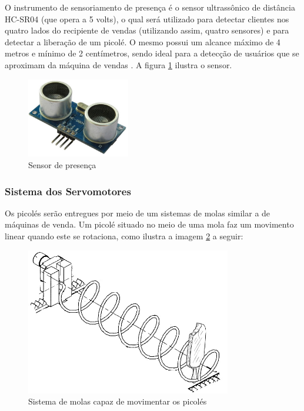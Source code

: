 O instrumento de sensoriamento de presença é o sensor ultrassônico de distância HC-SR04 (que opera a 5 volts), o qual será utilizado para detectar clientes nos quatro lados do recipiente de vendas (utilizando assim, quatro sensores) e para detectar a liberação de um picolé. O mesmo possui um alcance máximo de 4 metros e mínimo de 2 centímetros, sendo ideal para a detecção de usuários que se aproximam da máquina de vendas \cite{mq3}. A figura \ref{fig:sensor_presenca} ilustra o sensor.

\begin{figure}[H]
	\centering
    \includegraphics[width=0.4\textwidth]{figuras/sensor_presenca}
    \caption{Sensor de presença}
    \label{fig:sensor_presenca}
\end{figure}

\subsubsection{Sistema dos Servomotores}
Os picolés serão entregues por meio de um sistemas de molas similar a de máquinas de venda. Um picolé situado no meio de uma mola faz um movimento linear quando este se rotaciona, como ilustra a imagem \ref{fig:sistema_molas} a seguir:

\begin{figure}[H]
	\centering
    \includegraphics[width=0.8\textwidth]{figuras/sistema_molas}
    \caption{Sistema de molas capaz de movimentar os picolés}
    \label{fig:sistema_molas}
\end{figure}

